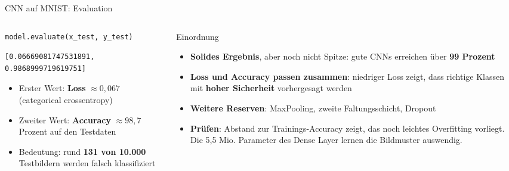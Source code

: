 \begin{frame}[fragile]{CNN auf MNIST: Evaluation}
    \footnotesize
\begin{columns}
\begin{column}{0.47\textwidth}
\begin{verbatim}
model.evaluate(x_test, y_test)
\end{verbatim}
\begin{verbatim}
[0.06669081747531891, 0.9868999719619751]
\end{verbatim}
\vspace{0.5em}
\begin{itemize}
  \item Erster Wert: \textbf{Loss} $\approx 0{,}067$ (categorical crossentropy)
  \item Zweiter Wert: \textbf{Accuracy} $\approx 98{,}7$ Prozent auf den Testdaten
  \item Bedeutung: rund \textbf{131 von 10.000} Testbildern werden falsch klassifiziert
\end{itemize}
\end{column}
\begin{column}{0.48\textwidth}
    \begin{block}{\footnotesize Einordnung}
\begin{itemize}
  \item \textbf{Solides Ergebnis}, aber noch nicht Spitze: gute CNNs erreichen über \textbf{99 Prozent}
  \item \textbf{Loss und Accuracy passen zusammen}:  niedriger Loss zeigt, dass richtige Klassen mit \textbf{hoher Sicherheit} vorhergesagt werden
  \item \textbf{Weitere Reserven}: MaxPooling, zweite Faltungsschicht, Dropout
  \item \textbf{Prüfen}: Abstand zur Trainings-Accuracy zeigt, das noch leichtes Overfitting vorliegt. Die 5,5 Mio. Parameter des Dense Layer lernen die Bildmuster auswendig.
\end{itemize}
\end{block}
\end{column}
\end{columns}
\end{frame}




